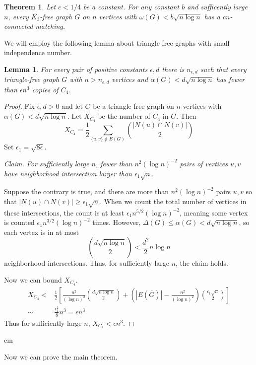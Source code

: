 \documentclass{article}
\newtheorem{theorem}{Theorem}
\newtheorem{lemma}{Lemma}
\begin{document}
\begin{theorem}
Let $c < 1/4$ be a constant.  For any constant $b$ and sufficently large $n$, every $\overline{K_3}$-free graph $G$ on $n$ vertices with $\omega(G) < b\sqrt{n\log n}$ has a $cn$-connected matching.
\end{theorem}

We will employ the following lemma about triangle free graphs with small independence number.

\begin{lemma}
For every pair of positive constants $\epsilon, d$ there is $n_{\epsilon, d}$ such that every triangle-free graph $G$ with $n > n_{\epsilon, d}$ vertices and $\alpha(G) < d\sqrt{n\log n}$ has fewer than $\epsilon n^3$ copies of $C_4$.
\end{lemma}
\begin{proof}
Fix $\epsilon, d> 0$ and let $G$ be a triangle free graph on $n$ vertices with $\alpha(G) < d\sqrt{n\log n}$.  Let $X_{C_4}$ be the number of $C_4$ in $G$.  Then
\[X_{C_4} = \frac{1}{2}\sum_{\{u,v\}\notin E(G)} {|N(u) \cap N(v)| \choose 2}\]
Set $\epsilon_1 = \sqrt{8\epsilon}$.

\noindent\textit{Claim. For sufficiently large $n$, fewer than $n^2(\log n)^{-2}$ pairs of vertices $u,v$ have neighborhood intersection larger than $\epsilon_1\sqrt{n}$.}

Suppose the contrary is true, and there are more than $n^2(\log n)^{-2}$ pairs $u,v$ so that $|N(u)\cap N(v)| \geq \epsilon_1\sqrt{n}$. When we count the total number of vertices in these intersections, the count is at least $\epsilon_1n^{5/2}(\log n)^{-2}$, meaning some vertex is counted $\epsilon_1n^{3/2}(\log n)^{-2}$ times.  However, $\Delta(G) \leq \alpha(G) < d\sqrt{n\log n}$, so each vertex is in at most \[{d\sqrt{n\log n}\choose 2 } < \frac{d^2}{2}n\log n\] neighborhood intersections.  Thus, for sufficiently large $n$,  the claim holds.

Now we can bound $X_{C_4}$.
\begin{eqnarray}X_{C_4} <& \frac{1}{2}\left[\frac{n^2}{(\log n)^2}{d\sqrt{n\log n}\choose 2}+ \left(|E(\overline{G})|- \frac{n^2}{(\log n)^2}\right){\epsilon_1\sqrt{n}\choose 2}\right]\\
\sim& \frac{\epsilon_1^2}{8}n^3 = \epsilon n^3
\end{eqnarray}
Thus for sufficiently large $n$, $X_{C_4} < \epsilon n^3$.
\end{proof}
 cm
 
Now we can prove the main theorem.
\end{document}
